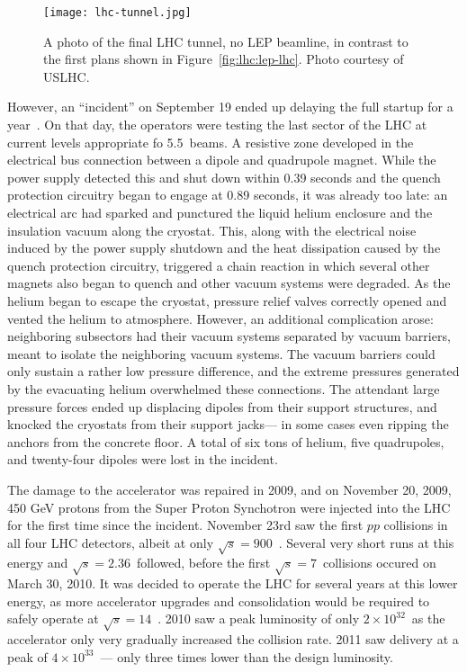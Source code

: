 
\begin{figure}
\centering
\texttt{[image: lhc-tunnel.jpg]}
\label{fig:lhc:lhc-tunnel}
\caption{A photo of the final LHC tunnel, no LEP beamline, in contrast to the first plans shown in Figure~\ref{fig:lhc:lep-lhc}. Photo courtesy of USLHC.}
\end{figure}


However, an ``incident'' on September 19 ended up delaying the full startup for a year~\cite{Incident}. On that day, the operators were testing the last sector of the LHC at current levels appropriate fo 5.5~\TeV beams. A resistive zone developed in the electrical bus connection between a dipole and quadrupole magnet. While the power supply detected this and shut down within 0.39 seconds and the quench protection circuitry began to engage at 0.89 seconds, it was already too late: an electrical arc had sparked and punctured the liquid helium enclosure and the insulation vacuum along the cryostat. This, along with the electrical noise induced by the power supply shutdown and the heat dissipation caused by the quench protection circuitry, triggered a chain reaction in which several other magnets also began to quench and other vacuum systems were degraded. As the helium began to escape the cryostat, pressure relief valves correctly opened and vented the helium to atmosphere. However, an additional complication arose: neighboring subsectors had their vacuum systems separated by vacuum barriers, meant to isolate the neighboring vacuum systems. The vacuum barriers could only sustain a rather low pressure difference, and the extreme pressures generated by the evacuating helium overwhelmed these connections. The attendant large pressure forces ended up displacing dipoles from their support structures, and knocked the cryostats from their support jacks--- in some cases even ripping the anchors from the concrete floor. A total of six tons of helium, five quadrupoles, and twenty-four dipoles were lost in the incident. 

The damage to the accelerator was repaired in 2009, and on November 20, 2009, 450 GeV protons from the Super Proton Synchotron were injected into the LHC for the first time since the incident. November 23rd saw the first $pp$ collisions in all four LHC detectors, albeit at only $\sqrt{s} = 900$~\GeV. Several very short runs at this energy and $\sqrt{s} = 2.36$~\TeV followed, before the first $\sqrt{s} = 7$~\TeV collisions occured on March 30, 2010. It was decided to operate the LHC for several years at this lower energy, as more accelerator upgrades and consolidation would be required to safely operate at $\sqrt{s} = 14$~\TeV. 2010 saw a peak luminosity of only $2\times10^{32}$~\lumirate as the accelerator only very gradually increased the collision rate. 2011 saw delivery at a peak of $4 \times 10^{33}$~\lumirate--- only three times lower than the design luminosity.

